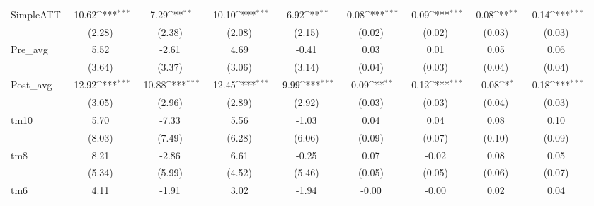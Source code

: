 {
\def\sym#1{\ifmmode^{#1}\else\(^{#1}\)\fi}
\begin{tabular}{l*{8}{c}}
SimpleATT           &      -10.62\sym{***}&       -7.29\sym{**} &      -10.10\sym{***}&       -6.92\sym{**} &       -0.08\sym{***}&       -0.09\sym{***}&       -0.08\sym{**} &       -0.14\sym{***}\\
                    &      (2.28)         &      (2.38)         &      (2.08)         &      (2.15)         &      (0.02)         &      (0.02)         &      (0.03)         &      (0.03)         \\
Pre\_avg             &        5.52         &       -2.61         &        4.69         &       -0.41         &        0.03         &        0.01         &        0.05         &        0.06         \\
                    &      (3.64)         &      (3.37)         &      (3.06)         &      (3.14)         &      (0.04)         &      (0.03)         &      (0.04)         &      (0.04)         \\
Post\_avg            &      -12.92\sym{***}&      -10.88\sym{***}&      -12.45\sym{***}&       -9.99\sym{***}&       -0.09\sym{**} &       -0.12\sym{***}&       -0.08\sym{*}  &       -0.18\sym{***}\\
                    &      (3.05)         &      (2.96)         &      (2.89)         &      (2.92)         &      (0.03)         &      (0.03)         &      (0.04)         &      (0.03)         \\
tm10                &        5.70         &       -7.33         &        5.56         &       -1.03         &        0.04         &        0.04         &        0.08         &        0.10         \\
                    &      (8.03)         &      (7.49)         &      (6.28)         &      (6.06)         &      (0.09)         &      (0.07)         &      (0.10)         &      (0.09)         \\
tm8                 &        8.21         &       -2.86         &        6.61         &       -0.25         &        0.07         &       -0.02         &        0.08         &        0.05         \\
                    &      (5.34)         &      (5.99)         &      (4.52)         &      (5.46)         &      (0.05)         &      (0.05)         &      (0.06)         &      (0.07)         \\
tm6                 &        4.11         &       -1.91         &        3.02         &       -1.94         &       -0.00         &       -0.00         &        0.02         &        0.04         \\

\end{tabular}}
